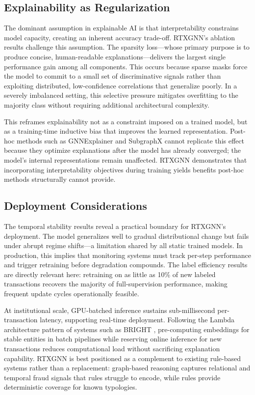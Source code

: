 \subsection{Explainability as Regularization}
\label{subsec:explainability_tradeoff}

The dominant assumption in explainable AI is that interpretability constrains model capacity, creating an inherent accuracy trade-off. RTXGNN's ablation results challenge this assumption. The sparsity loss—whose primary purpose is to produce concise, human-readable explanations—delivers the largest single performance gain among all components. This occurs because sparse masks force the model to commit to a small set of discriminative signals rather than exploiting distributed, low-confidence correlations that generalize poorly. In a severely imbalanced setting, this selective pressure mitigates overfitting to the majority class without requiring additional architectural complexity.

This reframes explainability not as a constraint imposed on a trained model, but as a training-time inductive bias that improves the learned representation. Post-hoc methods such as GNNExplainer \citep{ying2019gnnexplainer} and SubgraphX \citep{yuan2021subgraphx} cannot replicate this effect because they optimize explanations after the model has already converged; the model's internal representations remain unaffected. RTXGNN demonstrates that incorporating interpretability objectives during training yields benefits post-hoc methods structurally cannot provide.

\subsection{Deployment Considerations}
\label{subsec:deployment}

The temporal stability results reveal a practical boundary for RTXGNN's deployment. The model generalizes well to gradual distributional change but fails under abrupt regime shifts—a limitation shared by all static trained models. In production, this implies that monitoring systems must track per-step performance and trigger retraining before degradation compounds. The label efficiency results are directly relevant here: retraining on as little as 10\% of new labeled transactions recovers the majority of full-supervision performance, making frequent update cycles operationally feasible.

At institutional scale, GPU-batched inference sustains sub-millisecond per-transaction latency, supporting real-time deployment. Following the Lambda architecture pattern of systems such as BRIGHT \citep{lu2022bright}, pre-computing embeddings for stable entities in batch pipelines while reserving online inference for new transactions reduces computational load without sacrificing explanation capability. RTXGNN is best positioned as a complement to existing rule-based systems rather than a replacement: graph-based reasoning captures relational and temporal fraud signals that rules struggle to encode, while rules provide deterministic coverage for known typologies.

